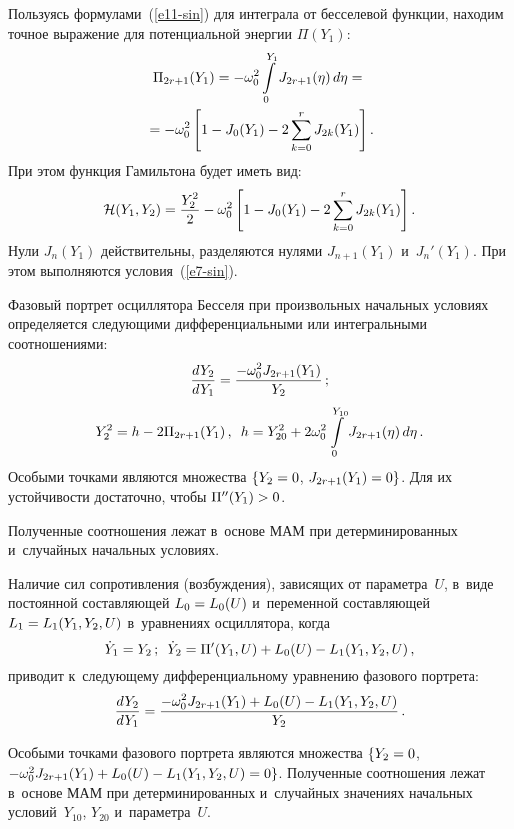 \begin{multicols}{2}
{Пользуясь формулами~(\ref{e11-sin}) для интеграла от бесселевой функции, находим 
точное выражение для потенциальной энергии $\Pi (Y_1)$:
\begin{multline*}
    \Pi_{2r+1} (Y_1) =-\omega_0^2 \int\limits_0^{Y_1} J_{2r+1}(\eta) \,d\eta={}\\
    {}= -\omega_0^2 \left[ 1- J_0 (Y_1) - 2 \sum\limits_{k=0}^r J_{2k} (Y_1)\right].
    \end{multline*}
При этом функция Гамильтона будет иметь вид:
\begin{equation}
\mathcal{H} (Y_1, Y_2) = \displaystyle\frac{\displaystyle Y_2^2\mathstrut}{\displaystyle 2\mathstrut} -\omega_0^2 \left[ 1- J_0 (Y_1) - 
2 \sum\limits_{k=0}^r J_{2k} (Y_1)\right]. \label{e2.12-sin}
\end{equation}
Нули $J_n(Y_1)$ действительны, разделяются нулями $J_{n+1} (Y_1)$ 
и~$J_n'(Y_1)$. При этом выполняются условия~(\ref{e7-sin}).

Фазовый портрет осциллятора Бесселя при произвольных начальных 
условиях определяется следующими дифференциальными или интегральными соотноше\-ниями:
\begin{equation*}
\fr{dY_2}{dY_1} = \fr{ -\omega_0^2 J_{2r+1} (Y_1)}{Y_2}\,; %
\end{equation*}
\begin{equation*}
Y_2^2 = h- 2\Pi_{2r+1} (Y_1)\,,\enskip 
h = Y_{20}^2 + 2 \omega_0^2 \iii_0^{Y_{10}} J_{2r+1} (\eta)\, d\eta\,. %
\end{equation*}
Особыми точками являются множества $\{Y_2\hm=0$, $J_{2r+1} (Y_1) \hm=0\}$. Для их 
устойчивости достаточно, чтобы $\Pi'' (Y_1) \hm>0$.

Полученные соотношения лежат в~основе МАМ при детерминированных 
и~случайных начальных условиях.


Наличие сил сопротивления (возбуждения), зависящих от параметра~$U$,
в~виде постоянной состав\-ля\-ющей $L_0 \hm= L_0 (U)$ и~переменной составляющей 
$L_1\hm=L_1(Y_1, Y_2,U)$ в~уравнениях осциллятора, когда
\begin{equation*}
    \dot Y_1 = Y_2\,;\enskip \dot Y_2 = \Pi' (Y_1, U) + L_0 (U) -L_1(Y_1, Y_2, U)\,,
    \end{equation*}
приводит к~следующему дифференциальному уравнению фазового портрета:
\begin{equation*}
\displaystyle\frac{\displaystyle dY_2\mathstrut}{\displaystyle dY_1\mathstrut} =\displaystyle\frac{\displaystyle -\omega_0^2 J_{2r+1} (Y_1) + L_0(U) - L_1 (Y_1, Y_2, U)\mathstrut}{\displaystyle Y_2\mathstrut}\,.
\end{equation*}

Особыми точками фазового портрета являются множества $\{Y_2 \hm=0$, 
$-\omega_0^2 J_{2r+1} (Y_1)\hm + L_0 (U)\hm - L_1 (Y_1, Y_2, U)\hm =0\}$.
Полученные соотношения лежат в~основе МАМ при детерминированных 
и~случайных значениях начальных условий~$Y_{10}$, $Y_{20}$ и~параметра~$U$.

}
\end{multicols}

